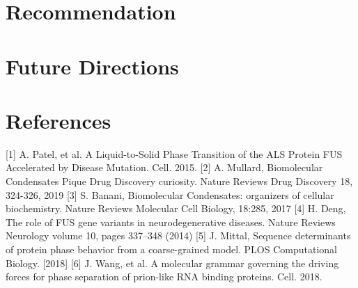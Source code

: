 \documentclass[12ptr]{article}
\begin{document}
\section{Recommendation}
\newpage

\section{Future Directions}
\newpage

\section{References}
[1] A. Patel, et al. A Liquid-to-Solid Phase Transition of the ALS Protein FUS Accelerated by Disease Mutation. Cell. 2015. 
[2] A. Mullard, Biomolecular Condensates Pique Drug Discovery curiosity. Nature Reviews Drug Discovery 18, 324-326, 2019
[3] S. Banani, Biomolecular Condensates: organizers of cellular biochemistry. Nature Reviews Molecular Cell Biology, 18:285, 2017
[4] H. Deng, The role of FUS gene variants in neurodegenerative diseases. Nature Reviews Neurology volume 10, pages 337–348 (2014)
[5] J. Mittal, Sequence determinants of protein phase behavior from a coarse-grained model. PLOS Computational Biology. [2018]
[6] J. Wang, et al. A molecular grammar governing the driving forces for phase separation of prion-like RNA binding proteins. Cell. 2018.
\end{document}
